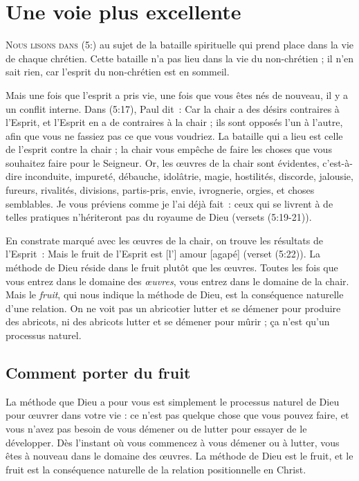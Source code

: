 \chapter{Une voie plus excellente}

\lettrine{N}{ous lisons dans (5:)}
 au sujet de la bataille spirituelle
 qui prend place dans la vie de chaque chrétien.
 Cette bataille n'a pas lieu dans la vie du non-chrétien ;
 il n'en sait rien, car l'esprit du non-chrétien est en sommeil.

Mais une fois que l'esprit a pris vie, une fois que vous êtes nés de nouveau,
 il y a un conflit interne. Dans (5:17), Paul dit~:
 \og Car la chair a des désirs contraires à l'Esprit,
 et l'Esprit en a de contraires à la chair ; ils sont opposés l'un à l'autre,
 afin que vous ne fassiez pas ce que vous voudriez. \fg{}
 La bataille qui a lieu est celle de l'esprit contre la chair ;
 la chair vous empêche de faire les choses que vous souhaitez
 faire pour le Seigneur.
 \og Or, les œuvres de la chair sont évidentes, c'est-à-dire inconduite,
 impureté, débauche, idolâtrie, magie, hostilités, discorde, jalousie,
 fureurs, rivalités, divisions, partis-pris, envie, ivrognerie, orgies,
 et choses semblables. Je vous préviens comme je l'ai déjà fait~:
 ceux qui se livrent à de telles pratiques n'hériteront pas
 du royaume de Dieu \fg{} (versets (5:19-21)).

En constrate marqué avec les œuvres de la chair, on trouve les résultats
 de l'Esprit~: \og Mais le fruit de l'Esprit est [l'] amour [agapé] \fg{}
 (verset (5:22)). La méthode de Dieu réside dans le fruit
 plutôt que les œuvres. Toutes les fois que vous entrez dans le domaine
 des \emph{œuvres}, vous entrez dans le domaine de la chair.
 Mais le \emph{fruit}, qui nous indique la méthode de Dieu, est la conséquence
 naturelle d'une relation. On ne voit pas un abricotier lutter
 et se démener pour produire des abricots, ni des abricots lutter
 et se démener pour mûrir ; ça n'est qu'un processus naturel.


\section*{Comment porter du fruit}

La méthode que Dieu a pour vous est simplement le processus naturel
 de Dieu pour œuvrer dans votre vie : ce n'est pas quelque chose
 que vous pouvez faire, et vous n'avez pas besoin de vous démener
 ou de lutter pour essayer de le développer.
 Dès l'instant où vous commencez à vous démener ou à lutter,
 vous êtes à nouveau dans le domaine des œuvres.
 La méthode de Dieu est le fruit, et le fruit est la conséquence
 naturelle de la relation positionnelle en Christ.

